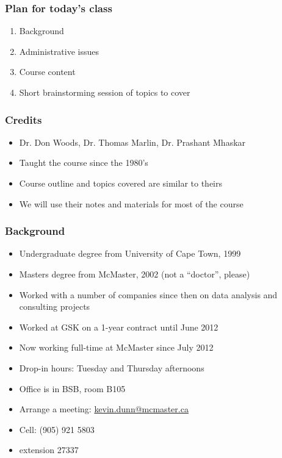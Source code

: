 
\begin{frame}\frametitle{Plan for today's class}
	\begin{enumerate}
		\item	Background
		\item	Administrative issues
		\item	Course content
		\item	Short brainstorming session of topics to cover
	\end{enumerate}
\end{frame}

\begin{frame}\frametitle{Credits}	
	\begin{itemize}
		\item	Dr. Don Woods, Dr. Thomas Marlin, Dr. Prashant Mhaskar
		\item	Taught the course since the 1980's
		\item	Course outline and topics covered are similar to theirs
		\item	We will use their notes and materials for most of the course
	\end{itemize}	
\end{frame}

\begin{frame}\frametitle{Background}
	{\color{myGreen}{About myself}}
	\begin{itemize}
		\item	Undergraduate degree from University of Cape Town, 1999
		\item	Masters degree from McMaster, 2002 (not a ``doctor'', please)
		\item	Worked with a number of companies since then on data analysis and consulting projects
		\item	Worked at GSK on a 1-year contract until June 2012		
		\item	Now working full-time at McMaster since July 2012
		\item	Drop-in hours: Tuesday and Thursday afternoons
		\item	Office is in BSB, room B105
		\item	Arrange a meeting: \url{kevin.dunn@mcmaster.ca}
		\item	Cell: (905) 921 5803
		\item	extension 27337
	\end{itemize}	
\end{frame}

